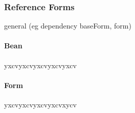 \subsubsection{Reference Forms}
\label{subsec:referenceForms}
general (eg dependency baseForm, form)

\paragraph{Bean}
yxcvyxcvyxcvyxcvyxcv

\paragraph{Form}
yxcvyxcvyxcvyxcvxycv



